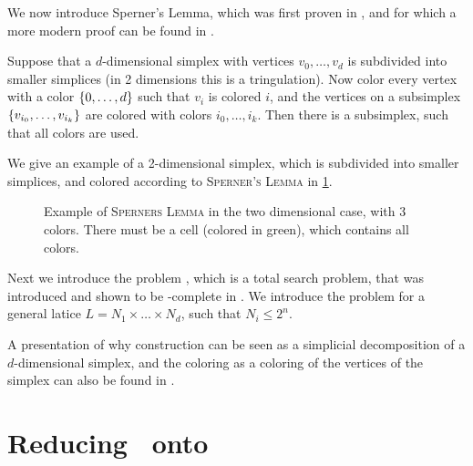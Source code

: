 We now introduce Sperner's Lemma, which was first proven in , and for which a more modern proof can be found in .
\begin{theorem}
    Suppose that a $d$-dimensional simplex with vertices $v_0, \dots, v_d$ is subdivided into smaller simplices (in 2 dimensions this is a tringulation). Now color every vertex with a color $\left\{0, \dots, d\right\}$ such that $v_i$ is colored $i$, and the vertices on a subsimplex $\left\{v_{i_0}, \dots, v_{i_k}\right\}$ are colored with colors $i_0, \dots, i_k$. Then there is a subsimplex, such that all colors are used.
\end{theorem}

We give an example of a 2-dimensional simplex, which is subdivided into smaller simplices, and colored according to \textsc{Sperner's Lemma} in \cref{fig:sperner_lemma_example}.

\begin{figure}[ht]
    \centering
    \caption[Example of \textsc{Sperners Lemma}]{Example of \textsc{Sperners Lemma} in the two dimensional case, with 3 colors. There must be a cell (colored in green), which contains all colors.}
    \label{fig:sperner_lemma_example}
\end{figure}

Next we introduce the problem \Sperner, which is a total search problem, that was introduced and shown to be \PPAD-complete in . We introduce the problem for a general latice $L = N_1 \times \dots \times N_d$, such that $N_i \leq 2^n$.


A presentation of why construction can be seen as a simplicial decomposition of a $d$-dimensional simplex, and the coloring as a coloring of the vertices of the simplex can also be found in \cite{papadimitriou_complexity_1994-1}.

\section{Reducing \Tarskistar\ onto \Sperner}

